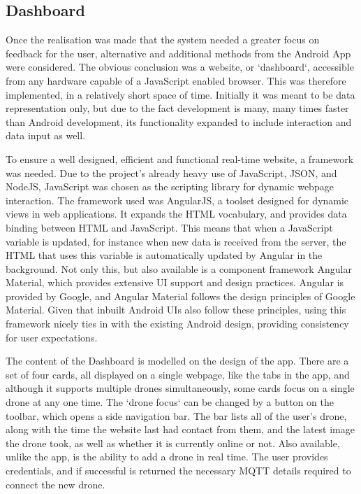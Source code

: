 \documentclass{article}
\begin{document}
\subsection{Dashboard} \label{Dashboard}
Once the realisation was made that the system needed a greater focus on feedback for the user, alternative and additional methods from the Android App were considered. The obvious conclusion was a website, or `dashboard`, accessible from any hardware capable of a JavaScript enabled browser. This was therefore implemented, in a relatively short space of time. Initially it was meant to be data representation only, but due to the fact development is many, many times faster than Android development, its functionality expanded to include interaction and data input as well. 

To ensure a well designed, efficient and functional real-time website, a framework was needed. Due to the project's already heavy use of JavaScript, JSON, and NodeJS, JavaScript was chosen as the scripting library for dynamic webpage interaction. The framework used was AngularJS, a toolset designed for dynamic views in web applications\cite{AngularJS}. It expands the HTML vocabulary, and provides data binding between HTML and JavaScript. This means that when a JavaScript variable is updated, for instance when new data is received from the server, the HTML that uses this variable is automatically updated by Angular in the background. Not only this, but also available is a component framework Angular Material\cite{AngularMaterial}, which provides extensive UI support and design practices. Angular is provided by Google, and Angular Material follows the design principles of Google Material\cite{GoogleMaterial}. Given that inbuilt Android UIs also follow these principles, using this framework nicely ties in with the existing Android design, providing consistency for user expectations. 

The content of the Dashboard is modelled on the design of the app. There are a set of four cards, all displayed on a single webpage, like the tabs in the app, and although it supports multiple drones simultaneously, some cards focus on a single drone at any one time. The `drone focus` can be changed by a button on the toolbar, which opens a side navigation bar. The bar lists all of the user's drone, along with the time the website last had contact from them, and the latest image the drone took, as well as whether it is currently online or not. Also available, unlike the app, is the ability to add a drone in real time. The user provides credentials, and if successful is returned the necessary MQTT details required to connect the new drone.
\end{document}
